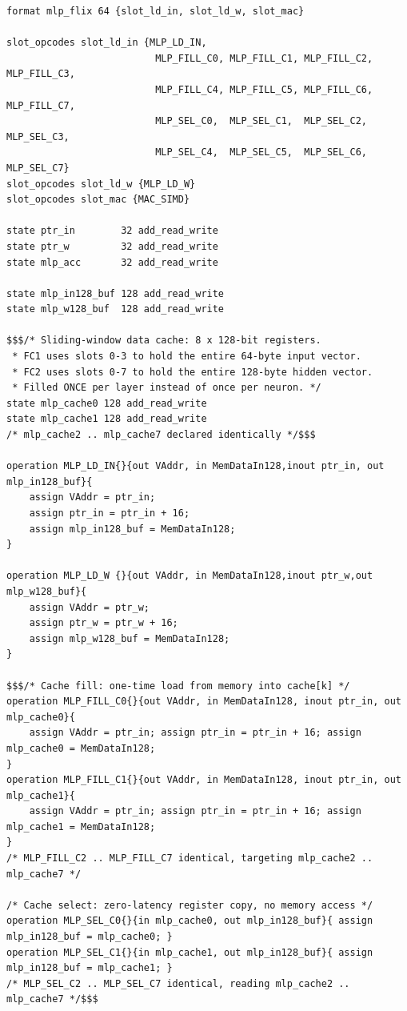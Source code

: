 \documentclass[11pt,a4paper]{report}
\begin{document}
\begin{lstlisting}[style=tie]
format mlp_flix 64 {slot_ld_in, slot_ld_w, slot_mac}

slot_opcodes slot_ld_in {MLP_LD_IN,
                          MLP_FILL_C0, MLP_FILL_C1, MLP_FILL_C2, MLP_FILL_C3,
                          MLP_FILL_C4, MLP_FILL_C5, MLP_FILL_C6, MLP_FILL_C7,
                          MLP_SEL_C0,  MLP_SEL_C1,  MLP_SEL_C2,  MLP_SEL_C3,
                          MLP_SEL_C4,  MLP_SEL_C5,  MLP_SEL_C6,  MLP_SEL_C7}
slot_opcodes slot_ld_w {MLP_LD_W}
slot_opcodes slot_mac {MAC_SIMD}

state ptr_in        32 add_read_write
state ptr_w         32 add_read_write
state mlp_acc       32 add_read_write

state mlp_in128_buf 128 add_read_write
state mlp_w128_buf  128 add_read_write

$$$/* Sliding-window data cache: 8 x 128-bit registers.
 * FC1 uses slots 0-3 to hold the entire 64-byte input vector.
 * FC2 uses slots 0-7 to hold the entire 128-byte hidden vector.
 * Filled ONCE per layer instead of once per neuron. */
state mlp_cache0 128 add_read_write
state mlp_cache1 128 add_read_write
/* mlp_cache2 .. mlp_cache7 declared identically */$$$

operation MLP_LD_IN{}{out VAddr, in MemDataIn128,inout ptr_in, out mlp_in128_buf}{
    assign VAddr = ptr_in;
    assign ptr_in = ptr_in + 16;
    assign mlp_in128_buf = MemDataIn128;
}

operation MLP_LD_W {}{out VAddr, in MemDataIn128,inout ptr_w,out mlp_w128_buf}{
    assign VAddr = ptr_w;
    assign ptr_w = ptr_w + 16;
    assign mlp_w128_buf = MemDataIn128;
}

$$$/* Cache fill: one-time load from memory into cache[k] */
operation MLP_FILL_C0{}{out VAddr, in MemDataIn128, inout ptr_in, out mlp_cache0}{
    assign VAddr = ptr_in; assign ptr_in = ptr_in + 16; assign mlp_cache0 = MemDataIn128;
}
operation MLP_FILL_C1{}{out VAddr, in MemDataIn128, inout ptr_in, out mlp_cache1}{
    assign VAddr = ptr_in; assign ptr_in = ptr_in + 16; assign mlp_cache1 = MemDataIn128;
}
/* MLP_FILL_C2 .. MLP_FILL_C7 identical, targeting mlp_cache2 .. mlp_cache7 */

/* Cache select: zero-latency register copy, no memory access */
operation MLP_SEL_C0{}{in mlp_cache0, out mlp_in128_buf}{ assign mlp_in128_buf = mlp_cache0; }
operation MLP_SEL_C1{}{in mlp_cache1, out mlp_in128_buf}{ assign mlp_in128_buf = mlp_cache1; }
/* MLP_SEL_C2 .. MLP_SEL_C7 identical, reading mlp_cache2 .. mlp_cache7 */$$$


\end{lstlisting}
\end{document}
